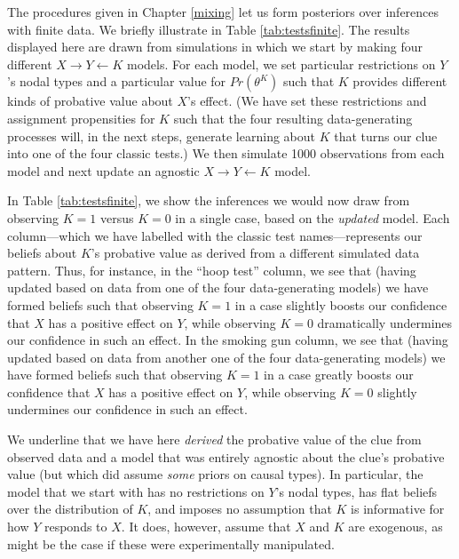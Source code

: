 \documentclass[
  12pt,
]{book}
\begin{document}
The procedures given in Chapter \ref{mixing} let us form posteriors over inferences with finite data. We briefly illustrate in Table \ref{tab:testsfinite}. The results displayed here are drawn from simulations in which we start by making four different \(X \rightarrow Y \leftarrow K\) models. For each model, we set particular restrictions on \(Y\)'s nodal types and a particular value for \(Pr(\theta^K)\) such that \(K\) provides different kinds of probative value about \(X\)'s effect. (We have set these restrictions and assignment propensities for \(K\) such that the four resulting data-generating processes will, in the next steps, generate learning about \(K\) that turns our clue into one of the four classic tests.) We then simulate 1000 observations from each model and next update an agnostic \(X \rightarrow Y \leftarrow K\) model.

In Table \ref{tab:testsfinite}, we show the inferences we would now draw from observing \(K=1\) versus \(K=0\) in a single case, based on the \emph{updated} model. Each column---which we have labelled with the classic test names---represents our beliefs about \(K\)'s probative value as derived from a different simulated data pattern. Thus, for instance, in the ``hoop test'' column, we see that (having updated based on data from one of the four data-generating models) we have formed beliefs such that observing \(K=1\) in a case slightly boosts our confidence that \(X\) has a positive effect on \(Y\), while observing \(K=0\) dramatically undermines our confidence in such an effect. In the smoking gun column, we see that (having updated based on data from another one of the four data-generating models) we have formed beliefs such that observing \(K=1\) in a case greatly boosts our confidence that \(X\) has a positive effect on \(Y\), while observing \(K=0\) slightly undermines our confidence in such an effect.

We underline that we have here \emph{derived} the probative value of the clue from observed data and a model that was entirely agnostic about the clue's probative value (but which did assume \emph{some} priors on causal types). In particular, the model that we start with has no restrictions on \(Y\)'s nodal types, has flat beliefs over the distribution of \(K\), and imposes no assumption that \(K\) is informative for how \(Y\) responds to \(X\). It does, however, assume that \(X\) and \(K\) are exogenous, as might be the case if these were experimentally manipulated.
\end{document}

